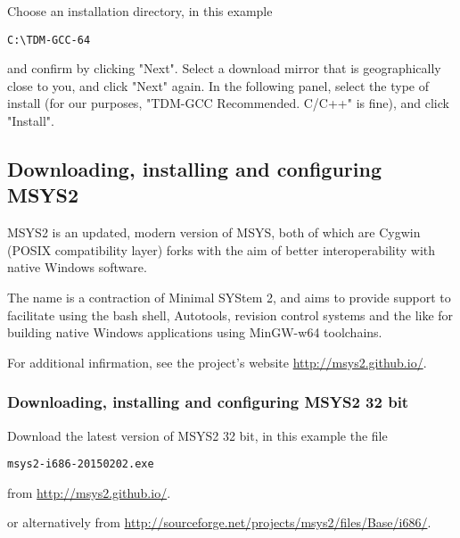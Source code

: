 Choose an installation directory, in this example

\begin{verbatim}
C:\TDM-GCC-64
\end{verbatim}

and confirm by clicking "Next". Select a download mirror that is geographically close to you, and click "Next" again. In the following panel, select the type of install (for our purposes, "TDM-GCC Recommended. C/C++" is fine), and click "Install".



\subsection{Downloading, installing and configuring MSYS2}
MSYS2 is an updated, modern version of MSYS, both of which are Cygwin (POSIX compatibility layer) forks with the aim of better interoperability with native Windows software.

The name is a contraction of Minimal SYStem 2, and aims to provide support to facilitate using the bash shell, Autotools, revision control systems and the like for building native Windows applications using MinGW-w64 toolchains.

For additional infirmation, see the project's website \href{http://msys2.github.io/}{http://msys2.github.io/}.


\subsubsection{Downloading, installing and configuring MSYS2 32 bit}

Download the latest version of MSYS2 32 bit, in this example the file
\begin{verbatim}
msys2-i686-20150202.exe
\end{verbatim}
from \href{http://msys2.github.io/}{http://msys2.github.io/}.

or alternatively from \href{http://sourceforge.net/projects/msys2/files/Base/i686/}{http://sourceforge.net/projects/msys2/files/Base/i686/}.

